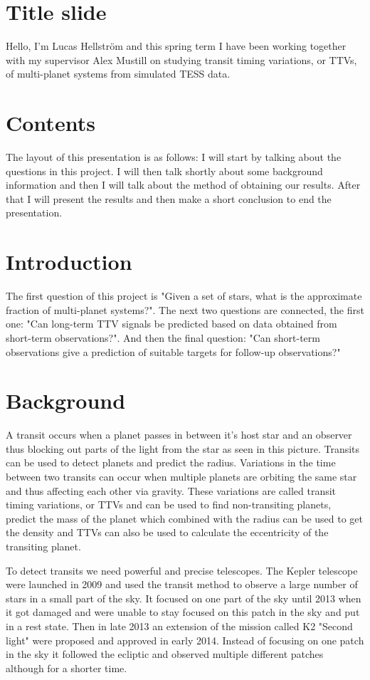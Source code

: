 \documentclass[12pt]{report}
\begin{document}
\section*{Title slide}
	Hello, I'm Lucas Hellström and this spring term I have been working together with my supervisor Alex Mustill on studying transit timing variations, or TTVs, of multi-planet systems from simulated TESS data. 
	
\section*{Contents}
	The layout of this presentation is as follows:
	I will start by talking about the questions in this project. I will then talk shortly about some background information and then I will talk about the method of obtaining our results. After that I will present the results and then make a short conclusion to end the presentation.
	
\section*{Introduction}
	The first question of this project is "Given a set of stars, what is the approximate fraction of multi-planet systems?". The next two questions are connected, the first one: "Can long-term TTV signals be predicted based on data obtained from short-term observations?". And then the final question: "Can short-term observations give a prediction of suitable targets for follow-up observations?" 
	
\section*{Background}
	A transit occurs when a planet passes in between it's host star and an observer thus blocking out parts of the light from the star as seen in this picture. Transits can be used to detect planets and predict the radius. Variations in the time between two transits can occur when multiple planets are orbiting the same star and thus affecting each other via gravity. These variations are called transit timing variations, or TTVs and can be used to find non-transiting planets, predict the mass of the planet which combined with the radius can be used to get the density and TTVs can also be used to calculate the eccentricity of the transiting planet.
	
	To detect transits we need powerful and precise telescopes. The Kepler telescope were launched in 2009 and used the transit method to observe a large number of stars in a small part of the sky. It focused on one part of the sky until 2013 when it got damaged and were unable to stay focused on this patch in the sky and put in a rest state. Then in late 2013 an extension of the mission called K2 "Second light" were proposed and approved in early 2014. Instead of focusing on one patch in the sky it followed the ecliptic and observed multiple different patches although for a shorter time. 
\end{document}
